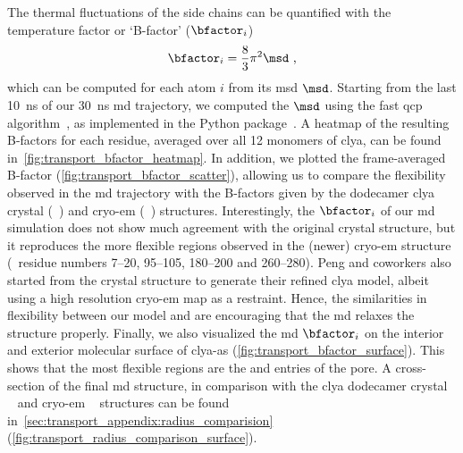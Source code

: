 The thermal fluctuations of the side chains can be quantified with the temperature factor or `B-factor'
($\bfactor_i$)~\cite{Bahar-1997}
%
\begin{align}\label{eq:bfactor}
  \bfactor_i = \dfrac{8}{3} \pi^2 \msd \text{ ,}
\end{align}
%
which can be computed for each atom $i$ from its \gls{msd} $\msd$. Starting from the last \SI{10}{\ns} of our
\SI{30}{\ns} \gls{md} trajectory, we computed the $\msd$ using the fast \gls{qcp}
algorithm~\cite{Theobald-2005,Liu-2010}, as implemented in the  Python
package~\cite{MichaudAgrawal-2011}. A heatmap of the resulting B-factors for each residue, averaged over all
12 monomers of \gls{clya}, can be found in~\cref{fig:transport_bfactor_heatmap}. In addition, we plotted the
frame-averaged B-factor (\cref{fig:transport_bfactor_scatter}), allowing us to compare the flexibility
observed in the \gls{md} trajectory with the B-factors given by the dodecamer \gls{clya} crystal
(~\cite{Mueller-2009}) and \gls{cryo-em} (~\cite{Peng-2019}) structures.
Interestingly, the $\bfactor_i$ of our \gls{md} simulation does not show much agreement with the original
 crystal structure, but it reproduces the more flexible regions observed in the (newer)
 \gls{cryo-em} structure (\ie~residue numbers \numrange{7}{20}, \numrange{95}{105},
\numrange{180}{200} and \numrange{260}{280}). Peng and coworkers also started from the  crystal
structure to generate their refined \gls{clya} model, albeit using a high resolution \gls{cryo-em} map as a
restraint. Hence, the similarities in flexibility between our model and  are encouraging that the
\gls{md} relaxes the structure properly. Finally, we also visualized the \gls{md} $\bfactor_i$ on the interior
and exterior molecular surface of \gls{clya-as} (\cref{fig:transport_bfactor_surface}). This shows that the
most flexible regions are the \cisi{} and \transi{} entries of the pore. A cross-section of the final \gls{md}
structure, in comparison with the \gls{clya} dodecamer crystal ~\cite{Mueller-2009} and
\gls{cryo-em} ~\cite{Peng-2019} structures can be found
in~\cref{sec:transport_appendix:radius_comparision} (\cref{fig:transport_radius_comparison_surface}).



